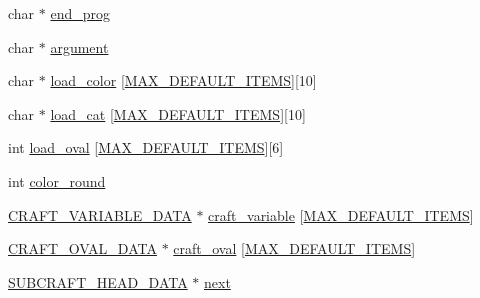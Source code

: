 \begin{DoxyCompactItemize}
\item 
char $\ast$ \hyperlink{structsubcraft__head__data_a7ecbf10c363f429751ca5093404658f8}{end\-\_\-prog}
\item 
char $\ast$ \hyperlink{structsubcraft__head__data_a00d84b6f7e39a3156409eb3a59e6d807}{argument}
\item 
char $\ast$ \hyperlink{structsubcraft__head__data_afb8ed0037e47e541e07a7f6acb5f99ca}{load\-\_\-color} \mbox{[}\hyperlink{structs_8h_af7510d0aa60174df974ee60ec5c772db}{M\-A\-X\-\_\-\-D\-E\-F\-A\-U\-L\-T\-\_\-\-I\-T\-E\-M\-S}\mbox{]}\mbox{[}10\mbox{]}
\item 
char $\ast$ \hyperlink{structsubcraft__head__data_aedee02b8935b1a39183128ac9f7bca55}{load\-\_\-cat} \mbox{[}\hyperlink{structs_8h_af7510d0aa60174df974ee60ec5c772db}{M\-A\-X\-\_\-\-D\-E\-F\-A\-U\-L\-T\-\_\-\-I\-T\-E\-M\-S}\mbox{]}\mbox{[}10\mbox{]}
\item 
int \hyperlink{structsubcraft__head__data_aa46e793e80691dbd4b14640169ce69a6}{load\-\_\-oval} \mbox{[}\hyperlink{structs_8h_af7510d0aa60174df974ee60ec5c772db}{M\-A\-X\-\_\-\-D\-E\-F\-A\-U\-L\-T\-\_\-\-I\-T\-E\-M\-S}\mbox{]}\mbox{[}6\mbox{]}
\item 
int \hyperlink{structsubcraft__head__data_af3f3fe1b55266eb06d64c439280715eb}{color\-\_\-round}
\item 
\hyperlink{structs_8h_ab0d2da1a6a6d78aadec3dcb738ed8e65}{C\-R\-A\-F\-T\-\_\-\-V\-A\-R\-I\-A\-B\-L\-E\-\_\-\-D\-A\-T\-A} $\ast$ \hyperlink{structsubcraft__head__data_a12581b1763e53f631a8950196c6c4b37}{craft\-\_\-variable} \mbox{[}\hyperlink{structs_8h_af7510d0aa60174df974ee60ec5c772db}{M\-A\-X\-\_\-\-D\-E\-F\-A\-U\-L\-T\-\_\-\-I\-T\-E\-M\-S}\mbox{]}
\item 
\hyperlink{structs_8h_a081de3be59a54856db890c99bf5d43df}{C\-R\-A\-F\-T\-\_\-\-O\-V\-A\-L\-\_\-\-D\-A\-T\-A} $\ast$ \hyperlink{structsubcraft__head__data_a68f92ad998edadb6606ea616f696e312}{craft\-\_\-oval} \mbox{[}\hyperlink{structs_8h_af7510d0aa60174df974ee60ec5c772db}{M\-A\-X\-\_\-\-D\-E\-F\-A\-U\-L\-T\-\_\-\-I\-T\-E\-M\-S}\mbox{]}
\item 
\hyperlink{structs_8h_a495309683b6f6354b20a79327e7d77d9}{S\-U\-B\-C\-R\-A\-F\-T\-\_\-\-H\-E\-A\-D\-\_\-\-D\-A\-T\-A} $\ast$ \hyperlink{structsubcraft__head__data_a8b3b1e4887e79d36c253b469ca51c656}{next}
\end{DoxyCompactItemize}


